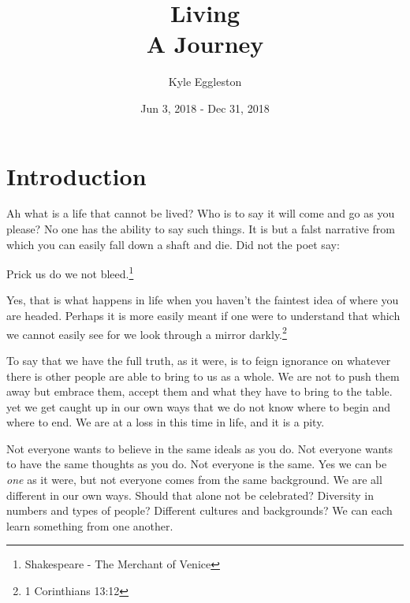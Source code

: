 \documentclass{article}
\title{%
  Living \\
  \large A Journey}
\author{Kyle Eggleston}
\date{Jun 3, 2018 - Dec 31, 2018}
\begin{document}
\maketitle

\section*{Introduction}

Ah what is a life that cannot be lived? Who is to say it will come and go as you
please? No one has the ability to say such things. It is but a falst narrative
from which you can easily fall down a shaft and die. Did not the poet say:

\begin{displayquote}
Prick us do we not bleed.\footnote{Shakespeare - The Merchant of Venice}
\end{displayquote}

Yes, that is what happens in life when you haven't the faintest idea of where
you are headed. Perhaps it is more easily meant if one were to understand that
which we cannot easily see for we look through a mirror 
darkly.\footnote{1 Corinthians 13:12}

To say that we have the full truth, as it were, is to feign ignorance on 
whatever there is other people are able to bring to us as a whole. We are not to 
push them away but embrace them, accept them and what they have to bring to the
table. yet we get caught up in our own ways that we do not know where to begin
and where to end. We are at a loss in this time in life, and it is a pity.

Not everyone wants to believe in the same ideals as you do. Not everyone wants
to have the same thoughts as you do. Not everyone is the same. Yes we can be 
\textit{one} as it were, but not everyone comes from the same background. We 
are all different in our own ways. Should that alone not be celebrated?
Diversity in numbers and types of people? Different cultures and backgrounds? We
can each learn something from one another.







\end{document}
